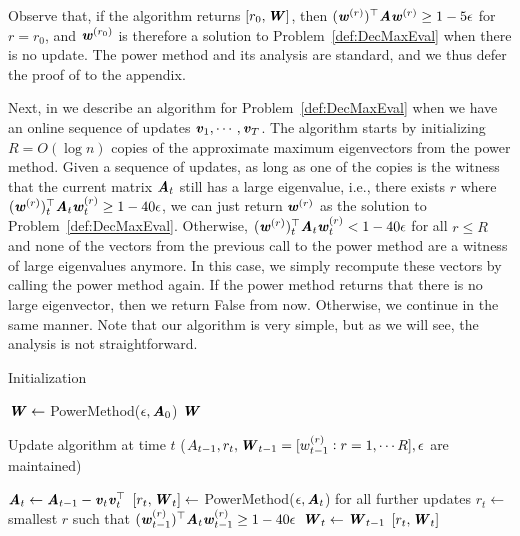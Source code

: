 Observe that, if the algorithm returns $[r_0,\WW]$, then $(\ww^{(r)})^{\top}\AA\ww^{(r)}\geq 1-5\epsilon$ for $r=r_0$, and $\ww^{(r_0)}$ is therefore a solution to Problem~\ref{def:DecMaxEval} when there is no update. The power method and its analysis are standard, and we thus defer the proof of  to the appendix. 




Next, in  we describe an algorithm for Problem~\ref{def:DecMaxEval} when we have an online sequence of updates $\vv_1,\cdots, \vv_T$. 
%
The algorithm starts by initializing $R = O(\log n)$ copies of the approximate maximum eigenvectors from the power method. Given a sequence of updates, as long as one of the copies is the witness that the current matrix $\AA_t$ still has a large eigenvalue, i.e., there exists $r$ where $(\ww^{(r)})_t^{\top}\AA_t\ww^{(r)}_t\geq 1-40\epsilon$, we can just return $\ww^{(r)}$ as the solution to Problem~\ref{def:DecMaxEval}. 
Otherwise, $(\ww^{(r)})_t^{\top}\AA_t\ww^{(r)}_t< 1-40\epsilon$ for all $r \le R$ and none of the vectors from the previous call to the power method are a witness of large eigenvalues anymore. In this case, we simply recompute these vectors by calling the power method again. If the power method returns that there is no large eigenvector, then we return {\sc False} from now. Otherwise, we continue in the same manner. 
%
Note that our algorithm is very simple, but as we will see, the analysis is not straightforward.
%
\begin{algorithm}
\caption{Initialization}\label{alg:Init}
 \begin{algorithmic}[1]
\State $\WW \leftarrow$ {\sc PowerMethod}($\epsilon,\AA_0$)\label{algline:PMInit}
\State \Return $\WW$
\EndProcedure
\end{algorithmic}
\end{algorithm}


\begin{algorithm}
\caption{Update algorithm at time $t$ ($A_{t-1},r_t,\WW_{t-1}= [w^{(r)}_{t-1}: r= 1,\cdots R], \eps$ are maintained)}\label{alg:DynamicMaxPM}
 \begin{algorithmic}[1]
\State $\AA_t \leftarrow \AA_{t-1}-\vv_t\vv_t^{\top}$
\label{algline:Check}
\State $[r_t,\WW_t]\leftarrow$ {\sc PowerMethod}($\epsilon,\AA_t$)\label{algline:PM}
\State {} for all further updates
\EndIf
\Else
\State $r_t\leftarrow $ smallest $r$ such that $(\ww^{(r)}_{t-1})^{\top}\AA_t\ww^{(r)}_{t-1} \geq 1-40\epsilon$
\State $\WW_t \leftarrow \WW_{t-1}$
\EndIf
\State \Return $[r_t,\WW_t]$
\EndProcedure 
 \end{algorithmic}
\end{algorithm}

